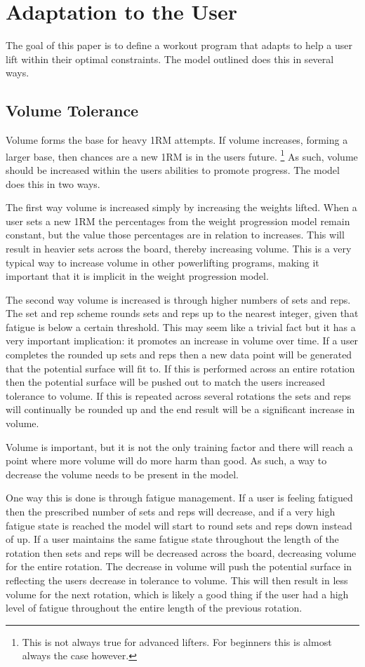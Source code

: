 \section{Adaptation to the User}

The goal of this paper is to define a workout program that adapts to help a user lift within their optimal constraints. The model outlined does this in several ways.

\subsection{Volume Tolerance}
Volume forms the base for heavy 1RM attempts. If volume increases, forming a larger base, then chances are a new 1RM is in the users future. \footnote{This is not always true for advanced lifters. For beginners this is almost always the case however.} As such, volume should be increased within the users abilities to promote progress. The model does this in two ways.

The first way volume is increased simply by increasing the weights lifted. When a user sets a new 1RM the percentages from the weight progression model remain constant, but the value those percentages are in relation to increases. This will result in heavier sets across the board, thereby increasing volume. This is a very typical way to increase volume in other powerlifting programs, making it important that it is implicit in the weight progression model.

The second way volume is increased is through higher numbers of sets and reps. The set and rep scheme rounds sets and reps up to the nearest integer, given that fatigue is below a certain threshold. This may seem like a trivial fact but it has a very important implication: it promotes an increase in volume over time. If a user completes the rounded up sets and reps then a new data point will be generated that the potential surface will fit to. If this is performed across an entire rotation then the potential surface will be pushed out to match the users increased tolerance to volume. If this is repeated across several rotations the sets and reps will continually be rounded up and the end result will be a significant increase in volume.

Volume is important, but it is not the only training factor and there will reach a point where more volume will do more harm than good. As such, a way to decrease the volume needs to be present in the model. 

One way this is done is through fatigue management. If a user is feeling fatigued then the prescribed number of sets and reps will decrease, and if a very high fatigue state is reached the model will start to round sets and reps down instead of up. If a user maintains the same fatigue state throughout the length of the rotation then sets and reps will be decreased across the board, decreasing volume for the entire rotation. The decrease in volume will push the potential surface in reflecting the users decrease in tolerance to volume. This will then result in less volume for the next rotation, which is likely a good thing if the user had a high level of fatigue throughout the entire length of the previous rotation.

